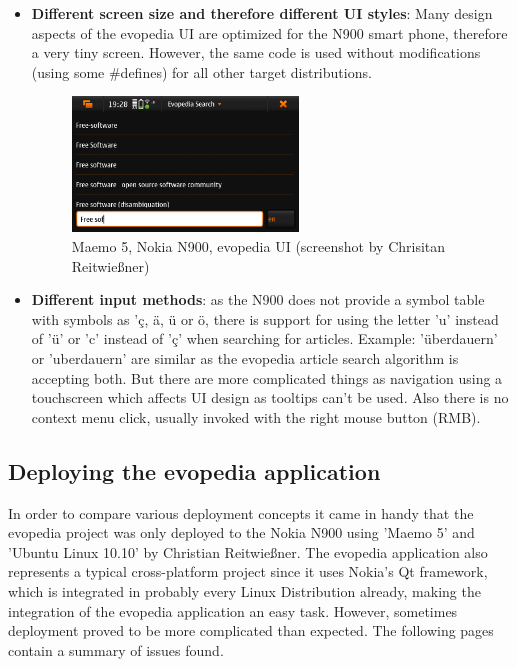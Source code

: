 \documentclass[a4paper,10pt]{article}
\begin{document}
\begin{itemize}
 \item \textbf{Different screen size and therefore different UI styles}: Many design aspects of the evopedia UI are optimized for the N900 smart phone, therefore a very tiny screen. However, the same code is used without modifications (using some \#defines) for all other target distributions.

\begin{figure}[h]
\caption[Kurzeintrag]{Maemo 5, Nokia N900, evopedia UI (screenshot by Chrisitan Reitwie\ss ner)}
  \centering

\includegraphics[width=60mm]{images/target_n900_search.png}
\end{figure}

 \item \textbf{Different input methods}: as the N900 does not provide a symbol table with symbols as '\c c, \"a, \"u or \"o, there is support for using the letter 'u' instead of '\"u' or 'c' instead of '\c c' when searching for articles. Example: '\"uberdauern' or 'uberdauern' are similar as the evopedia article search algorithm is accepting both. But there are more complicated things as navigation using a touchscreen which affects UI design as tooltips can't be used. Also there is no context menu click, usually invoked with the right mouse button (RMB).

\end{itemize}

\subsection{Deploying the evopedia application}
In order to compare various deployment concepts it came in handy that the evopedia project was only deployed to the Nokia N900 using 'Maemo 5' and 'Ubuntu Linux 10.10' by Christian Reitwie\ss ner. The evopedia application also represents a typical cross-platform project since it uses Nokia's Qt framework, which is integrated in probably every Linux Distribution already, making the integration of the evopedia application an easy task. However, sometimes deployment proved to be more complicated than expected. The following pages contain a summary of issues found.
\end{document}
